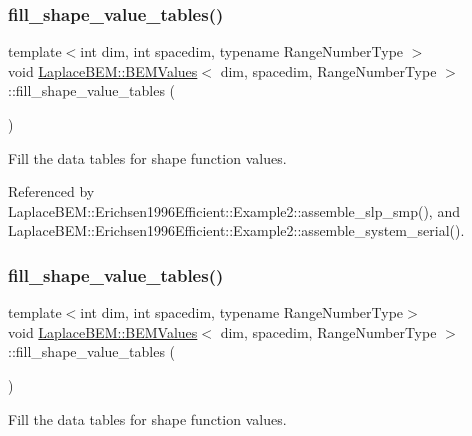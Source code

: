 \subsubsection{\texorpdfstring{fill\+\_\+shape\+\_\+value\+\_\+tables()}{fill\_shape\_value\_tables()}\hspace{0.1cm}{\footnotesize\ttfamily [1/2]}}
{\footnotesize\ttfamily template$<$int dim, int spacedim, typename Range\+Number\+Type $>$ \\
void \hyperlink{classLaplaceBEM_1_1BEMValues}{Laplace\+B\+E\+M\+::\+B\+E\+M\+Values}$<$ dim, spacedim, Range\+Number\+Type $>$\+::fill\+\_\+shape\+\_\+value\+\_\+tables (\begin{DoxyParamCaption}{ }\end{DoxyParamCaption})}

Fill the data tables for shape function values. 

Referenced by Laplace\+B\+E\+M\+::\+Erichsen1996\+Efficient\+::\+Example2\+::assemble\+\_\+slp\+\_\+smp(), and Laplace\+B\+E\+M\+::\+Erichsen1996\+Efficient\+::\+Example2\+::assemble\+\_\+system\+\_\+serial().

\mbox{\label{classLaplaceBEM_1_1BEMValues_a3fd86680a51e688d003d5a0bfe09629f}} 
\subsubsection{\texorpdfstring{fill\+\_\+shape\+\_\+value\+\_\+tables()}{fill\_shape\_value\_tables()}\hspace{0.1cm}{\footnotesize\ttfamily [2/2]}}
{\footnotesize\ttfamily template$<$int dim, int spacedim, typename Range\+Number\+Type$>$ \\
void \hyperlink{classLaplaceBEM_1_1BEMValues}{Laplace\+B\+E\+M\+::\+B\+E\+M\+Values}$<$ dim, spacedim, Range\+Number\+Type $>$\+::fill\+\_\+shape\+\_\+value\+\_\+tables (\begin{DoxyParamCaption}{ }\end{DoxyParamCaption})}

Fill the data tables for shape function values. \mbox{\label{classLaplaceBEM_1_1BEMValues_a5646d3caf1ede82b5dca1f82be893dd4}} 
